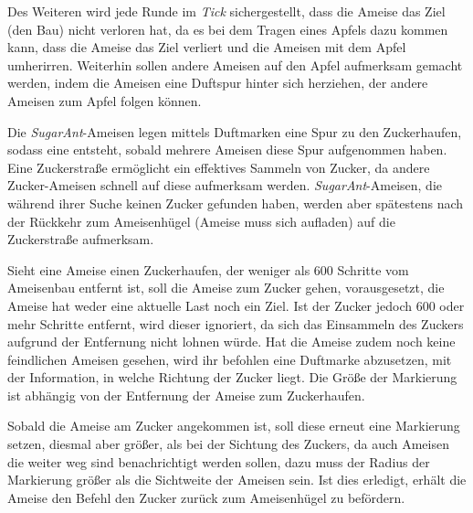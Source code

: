 Des Weiteren wird jede Runde im \textit{Tick} sichergestellt, dass die Ameise das Ziel (den Bau) nicht verloren hat, da es bei dem  Tragen eines Apfels dazu kommen kann, dass die Ameise das Ziel verliert und die Ameisen mit dem Apfel umherirren. Weiterhin sollen andere Ameisen auf den Apfel aufmerksam gemacht werden, indem die Ameisen eine Duftspur hinter sich herziehen, der andere Ameisen zum Apfel folgen können.


Die \textit{SugarAnt}-Ameisen legen mittels Duftmarken eine Spur zu den Zuckerhaufen, sodass eine  entsteht, sobald mehrere Ameisen diese Spur aufgenommen haben. Eine Zuckerstraße ermöglicht ein effektives Sammeln von Zucker, da andere Zucker-Ameisen schnell auf diese aufmerksam werden. \textit{SugarAnt}-Ameisen, die während ihrer Suche keinen Zucker gefunden haben, werden aber spätestens nach der Rückkehr zum Ameisenhügel (Ameise muss sich aufladen) auf die Zuckerstraße aufmerksam.

Sieht eine Ameise einen Zuckerhaufen, der weniger als 600 Schritte vom Ameisenbau entfernt ist, soll die Ameise zum Zucker gehen, vorausgesetzt, die Ameise hat weder eine aktuelle Last noch ein Ziel. Ist der  Zucker jedoch 600 oder mehr Schritte entfernt, wird dieser ignoriert, da sich das Einsammeln des Zuckers aufgrund der Entfernung nicht lohnen würde. Hat die Ameise zudem noch keine feindlichen Ameisen gesehen, wird ihr befohlen eine Duftmarke abzusetzen, mit der Information, in welche Richtung der Zucker liegt. Die Größe der Markierung ist abhängig von der Entfernung der Ameise zum Zuckerhaufen.

Sobald die Ameise am Zucker angekommen ist, soll diese erneut eine Markierung setzen, diesmal aber größer, als bei der Sichtung des Zuckers, da auch Ameisen die weiter weg sind benachrichtigt werden sollen, dazu muss der Radius der Markierung größer als die Sichtweite der Ameisen sein. Ist dies erledigt, erhält die Ameise den Befehl den Zucker zurück zum Ameisenhügel zu befördern.


